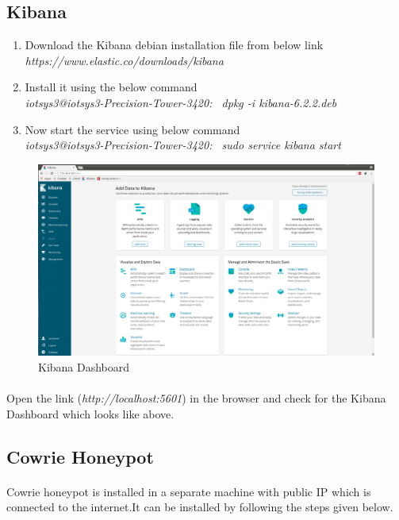 \documentclass{report}
\begin{document}
\subsection{Kibana}

\begin{enumerate}
\item Download the Kibana debian installation file from below link\\
\textit{https://www.elastic.co/downloads/kibana}
\item Install it using the below command\\
\textit{{\color{blue}iotsys3@iotsys3-Precision-Tower-3420:~} dpkg -i kibana-6.2.2.deb}
\item Now start the service using below command\\
\textit{{\color{blue}iotsys3@iotsys3-Precision-Tower-3420:~} sudo service kibana start}
\end{enumerate}



\begin{figure}[H]
\centering
\caption{Kibana Dashboard}
\includegraphics[scale=0.22]{Kibana_Installation}
\end{figure}

\paragraph{}
Open the link (\textit{http://localhost:5601}) in the browser and check for the Kibana Dashboard which looks like above.


\subsection{Cowrie Honeypot}

\paragraph{}
Cowrie honeypot is installed in a separate machine with public IP which is connected to the internet.It can be installed by following the steps given below.
\end{document}
